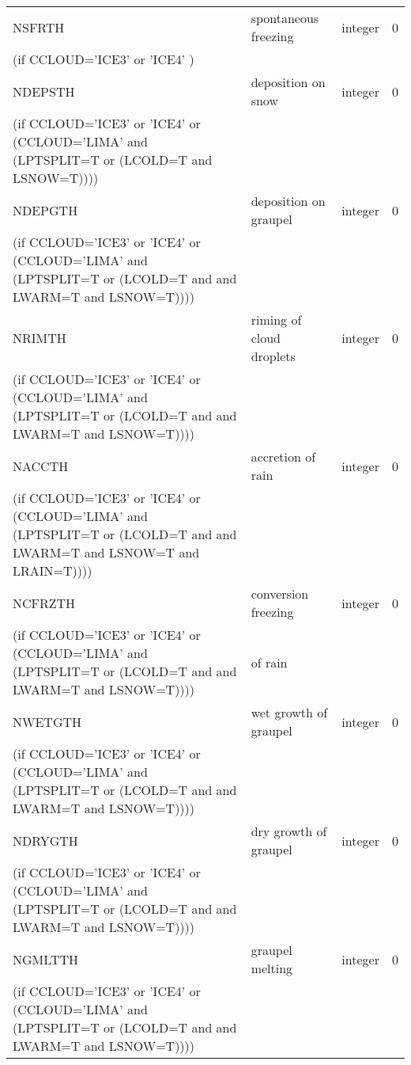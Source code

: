 \begin{longtable} {|p{}|p{}|>{\centering}p{}|p{}<{\centering}|}
NSFRTH   & spontaneous freezing& integer  &  0 \index{NSFRTH!\innam{NAM\_BU\_RTH}}\\ \nopagebreak
(if CCLOUD='ICE3' or 'ICE4' ) & &   &  \\\hline
NDEPSTH  & deposition on snow  & integer  &  0 \index{NDEPSTH!\innam{NAM\_BU\_RTH}}\\ \nopagebreak
(if CCLOUD='ICE3' or 'ICE4' or (CCLOUD='LIMA' and (LPTSPLIT=T or (LCOLD=T and LSNOW=T)))) & &   &  \\\hline
NDEPGTH  & deposition on graupel & integer  &  0 \index{NDEPGTH!\innam{NAM\_BU\_RTH}}\\ \nopagebreak
(if CCLOUD='ICE3' or 'ICE4' or (CCLOUD='LIMA' and (LPTSPLIT=T or (LCOLD=T and and LWARM=T and LSNOW=T)))) & &   &  \\\hline
NRIMTH   & riming of cloud droplets & integer  &  0 \index{NRIMTH!\innam{NAM\_BU\_RTH}}\\ \nopagebreak
(if CCLOUD='ICE3' or 'ICE4' or (CCLOUD='LIMA' and (LPTSPLIT=T or (LCOLD=T and and LWARM=T and LSNOW=T)))) & &   &  \\\hline
NACCTH   & accretion of rain   & integer  &  0 \index{NACCTH!\innam{NAM\_BU\_RTH}}\\ \nopagebreak
(if CCLOUD='ICE3' or 'ICE4' or (CCLOUD='LIMA' and (LPTSPLIT=T or (LCOLD=T and and LWARM=T and LSNOW=T and LRAIN=T)))) & &   &  \\\hline
NCFRZTH  & conversion freezing & integer  &  0 \index{NCFRZTH!\innam{NAM\_BU\_RTH}}\\ \nopagebreak
(if CCLOUD='ICE3' or 'ICE4' or (CCLOUD='LIMA' and (LPTSPLIT=T or (LCOLD=T and and LWARM=T and LSNOW=T)))) & of rain &   &  \\\hline
NWETGTH  & wet growth of graupel& integer  &  0 \index{NWETGTH!\innam{NAM\_BU\_RTH}}\\ \nopagebreak
(if CCLOUD='ICE3' or 'ICE4' or (CCLOUD='LIMA' and (LPTSPLIT=T or (LCOLD=T and and LWARM=T and LSNOW=T)))) & &   &  \\\hline
NDRYGTH  & dry growth of graupel& integer  &  0 \index{NDRYGTH!\innam{NAM\_BU\_RTH}}\\ \nopagebreak
(if CCLOUD='ICE3' or 'ICE4' or (CCLOUD='LIMA' and (LPTSPLIT=T or (LCOLD=T and and LWARM=T and LSNOW=T)))) & &   &  \\\hline
NGMLTTH  & graupel melting      & integer  &  0 \index{NGMLTTH!\innam{NAM\_BU\_RTH}}\\ \nopagebreak
(if CCLOUD='ICE3' or 'ICE4' or (CCLOUD='LIMA' and (LPTSPLIT=T or (LCOLD=T and and LWARM=T and LSNOW=T)))) & &   &  \\\hline

\end{longtable}
